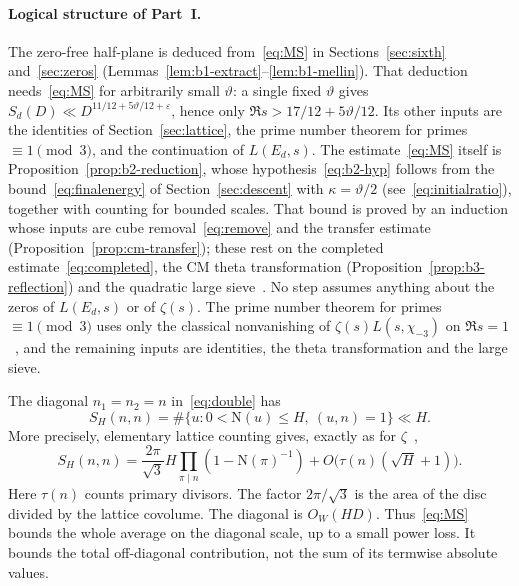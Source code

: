 \documentclass[11pt]{article}
\numberwithin{equation}{section}
\newcommand{\N}{\mathrm N}
\begin{document}
\paragraph{Logical structure of Part~I.} The zero-free half-plane is deduced
from~\eqref{eq:MS} in Sections~\ref{sec:sixth} and~\ref{sec:zeros}
(Lemmas~\ref{lem:b1-extract}--\ref{lem:b1-mellin}). That deduction needs~\eqref{eq:MS}
for arbitrarily small $\vartheta$: a single fixed $\vartheta$ gives
$S_d(D)\ll D^{11/12+5\vartheta/12+\varepsilon}$, hence only $\Re s>17/12+5\vartheta/12$. Its other
inputs are the identities of Section~\ref{sec:lattice}, the prime number theorem for primes
$\equiv1\pmod3$, and the continuation of $L(E_d,s)$. The estimate~\eqref{eq:MS} itself is
Proposition~\ref{prop:b2-reduction}, whose hypothesis~\eqref{eq:b2-hyp} follows from the
bound~\eqref{eq:finalenergy} of Section~\ref{sec:descent} with $\kappa=\vartheta/2$
(see~\eqref{eq:initialratio}), together with counting for bounded scales. That bound is proved
by an induction whose inputs are cube removal~\eqref{eq:remove} and the transfer estimate
(Proposition~\ref{prop:cm-transfer}); these rest on the completed estimate~\eqref{eq:completed},
the CM theta transformation (Proposition~\ref{prop:b3-reflection}) and the quadratic large
sieve~\cite{GL}. No step assumes anything about the zeros of $L(E_d,s)$ or of $\zeta(s)$. The
prime number theorem for primes $\equiv1\pmod3$ uses only the classical nonvanishing of
$\zeta(s)L(s,\chi_{-3})$ on $\Re s=1$~\cite{Had96,Lan03}, and the remaining inputs are identities, the theta
transformation and the large sieve.

The diagonal $n_1=n_2=n$ in~\eqref{eq:double} has
\begin{equation}\label{eq:d018}
 S_H(n,n)=\#\{u:0<\N(u)\le H,\ (u,n)=1\}\ll H.
\end{equation}
More precisely, elementary lattice counting gives, exactly as for $\zeta$~\cite[(4.1)--(4.2)]{ZG},
\begin{equation}\label{eq:d019}
 S_H(n,n)=\frac{2\pi}{\sqrt3}H
       \prod_{\pi\mid n}(1-\N(\pi)^{-1})
       +O\bigl(\tau(n)(\sqrt H+1)\bigr).
\end{equation}
Here $\tau(n)$ counts primary divisors. The factor $2\pi/\sqrt3$ is the
area of the disc divided by the lattice covolume. The diagonal is
$O_W(HD)$. Thus~\eqref{eq:MS} bounds the whole average on the diagonal
scale, up to a small power loss. It bounds the total off-diagonal
contribution, not the sum of its termwise absolute values.
\end{document}
